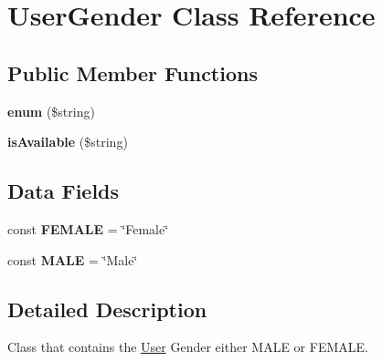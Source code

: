 \hypertarget{class_user_gender}{\section{User\+Gender Class Reference}
\label{class_user_gender}
}
\subsection*{Public Member Functions}
\begin{DoxyCompactItemize}
\item 
\hypertarget{class_user_gender_a7967c6e825979f8b2faefba3d95c3821}{{\bfseries enum} (\$string)}\label{class_user_gender_a7967c6e825979f8b2faefba3d95c3821}

\item 
\hypertarget{class_user_gender_a30537daeb912ea3e348c579c4f930841}{{\bfseries is\+Available} (\$string)}\label{class_user_gender_a30537daeb912ea3e348c579c4f930841}

\end{DoxyCompactItemize}
\subsection*{Data Fields}
\begin{DoxyCompactItemize}
\item 
\hypertarget{class_user_gender_aeb66f1ec16c206e328e07b9d34f5f9ac}{const {\bfseries F\+E\+M\+A\+L\+E} = \char`\"{}Female\char`\"{}}\label{class_user_gender_aeb66f1ec16c206e328e07b9d34f5f9ac}

\item 
\hypertarget{class_user_gender_a6585076f1e569b15b273dd8102120149}{const {\bfseries M\+A\+L\+E} = \char`\"{}Male\char`\"{}}\label{class_user_gender_a6585076f1e569b15b273dd8102120149}

\end{DoxyCompactItemize}


\subsection{Detailed Description}
Class that contains the \hyperlink{class_user}{User} Gender either M\+A\+L\+E or F\+E\+M\+A\+L\+E. 